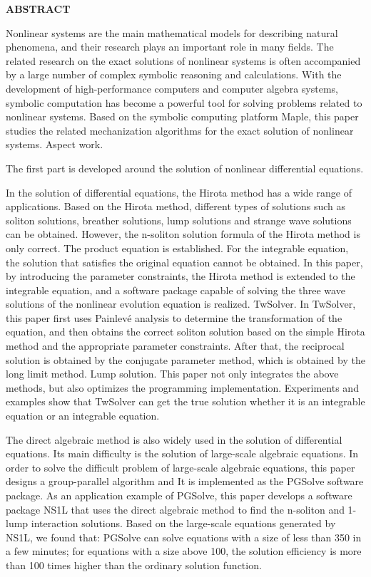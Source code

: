 {}
\centerline{\bfseries ABSTRACT}

\linespread{1.4}
\bigskip

Nonlinear systems are the main mathematical models for describing natural phenomena, and their research plays an important role in many fields. The related research on the exact solutions of nonlinear systems is often accompanied by a large number of complex symbolic reasoning and calculations. With the development of high-performance computers and computer algebra systems, symbolic computation has become a powerful tool for solving problems related to nonlinear systems. Based on the symbolic computing platform Maple, this paper studies the related mechanization algorithms for the exact solution of nonlinear systems. Aspect work.

The first part is developed around the solution of nonlinear differential equations.

In the solution of differential equations, the Hirota method has a wide range of applications. Based on the Hirota method, different types of solutions such as soliton solutions, breather solutions, lump solutions and strange wave solutions can be obtained. However, the n-soliton solution formula of the Hirota method is only correct. The product equation is established. For the integrable equation, the solution that satisfies the original equation cannot be obtained. In this paper, by introducing the parameter constraints, the Hirota method is extended to the integrable equation, and a software package capable of solving the three wave solutions of the nonlinear evolution equation is realized. TwSolver. In TwSolver, this paper first uses Painlevé analysis to determine the transformation of the equation, and then obtains the correct soliton solution based on the simple Hirota method and the appropriate parameter constraints. After that, the reciprocal solution is obtained by the conjugate parameter method, which is obtained by the long limit method. Lump solution. This paper not only integrates the above methods, but also optimizes the programming implementation. Experiments and examples show that TwSolver can get the true solution whether it is an integrable equation or an integrable equation.

The direct algebraic method is also widely used in the solution of differential equations. Its main difficulty is the solution of large-scale algebraic equations. In order to solve the difficult problem of large-scale algebraic equations, this paper designs a group-parallel algorithm and It is implemented as the PGSolve software package. As an application example of PGSolve, this paper develops a software package NS1L that uses the direct algebraic method to find the n-soliton and 1-lump interaction solutions. Based on the large-scale equations generated by NS1L, we found that: PGSolve can solve equations with a size of less than 350 in a few minutes; for equations with a size above 100, the solution efficiency is more than 100 times higher than the ordinary solution function.

